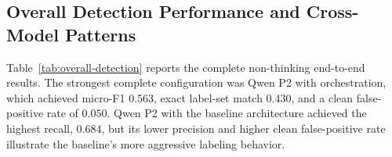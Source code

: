\documentclass[11pt,a4paper]{article}
\begin{document}
\subsection{Overall Detection Performance and Cross-Model Patterns}
\label{subsec:overall-results}
\label{subsec:cross-model}

Table~\ref{tab:overall-detection} reports the complete non-thinking end-to-end
results. The strongest complete configuration was Qwen P2 with orchestration,
which achieved micro-F1 $0.563$, exact label-set match $0.430$, and a clean
false-positive rate of $0.050$. Qwen P2 with the baseline architecture achieved
the highest recall, $0.684$, but its lower precision and higher clean
false-positive rate illustrate the baseline's more aggressive labeling
behavior.
\end{document}
